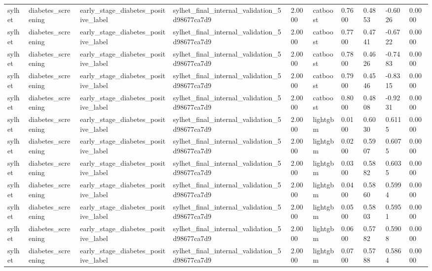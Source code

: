 \begin{tabular}{llllllllll}
sylhet & diabetes\_screening & early\_stage\_diabetes\_positive\_label & sylhet\_final\_internal\_validation\_5d98677ca7d9 & 2.0000 & catboost & 0.7600 & 0.4853 & -0.6026 & 0.0000 \\
sylhet & diabetes\_screening & early\_stage\_diabetes\_positive\_label & sylhet\_final\_internal\_validation\_5d98677ca7d9 & 2.0000 & catboost & 0.7700 & 0.4741 & -0.6722 & 0.0000 \\
sylhet & diabetes\_screening & early\_stage\_diabetes\_positive\_label & sylhet\_final\_internal\_validation\_5d98677ca7d9 & 2.0000 & catboost & 0.7800 & 0.4626 & -0.7483 & 0.0000 \\
sylhet & diabetes\_screening & early\_stage\_diabetes\_positive\_label & sylhet\_final\_internal\_validation\_5d98677ca7d9 & 2.0000 & catboost & 0.7900 & 0.4546 & -0.8315 & 0.0000 \\
sylhet & diabetes\_screening & early\_stage\_diabetes\_positive\_label & sylhet\_final\_internal\_validation\_5d98677ca7d9 & 2.0000 & catboost & 0.8000 & 0.4808 & -0.9231 & 0.0000 \\
sylhet & diabetes\_screening & early\_stage\_diabetes\_positive\_label & sylhet\_final\_internal\_validation\_5d98677ca7d9 & 2.0000 & lightgbm & 0.0100 & 0.6030 & 0.6115 & 0.0000 \\
sylhet & diabetes\_screening & early\_stage\_diabetes\_positive\_label & sylhet\_final\_internal\_validation\_5d98677ca7d9 & 2.0000 & lightgbm & 0.0200 & 0.5907 & 0.6075 & 0.0000 \\
sylhet & diabetes\_screening & early\_stage\_diabetes\_positive\_label & sylhet\_final\_internal\_validation\_5d98677ca7d9 & 2.0000 & lightgbm & 0.0300 & 0.5882 & 0.6035 & 0.0000 \\
sylhet & diabetes\_screening & early\_stage\_diabetes\_positive\_label & sylhet\_final\_internal\_validation\_5d98677ca7d9 & 2.0000 & lightgbm & 0.0400 & 0.5860 & 0.5994 & 0.0000 \\
sylhet & diabetes\_screening & early\_stage\_diabetes\_positive\_label & sylhet\_final\_internal\_validation\_5d98677ca7d9 & 2.0000 & lightgbm & 0.0500 & 0.5803 & 0.5951 & 0.0000 \\
sylhet & diabetes\_screening & early\_stage\_diabetes\_positive\_label & sylhet\_final\_internal\_validation\_5d98677ca7d9 & 2.0000 & lightgbm & 0.0600 & 0.5782 & 0.5908 & 0.0000 \\
sylhet & diabetes\_screening & early\_stage\_diabetes\_positive\_label & sylhet\_final\_internal\_validation\_5d98677ca7d9 & 2.0000 & lightgbm & 0.0700 & 0.5788 & 0.5864 & 0.0000 \\

\end{tabular}
